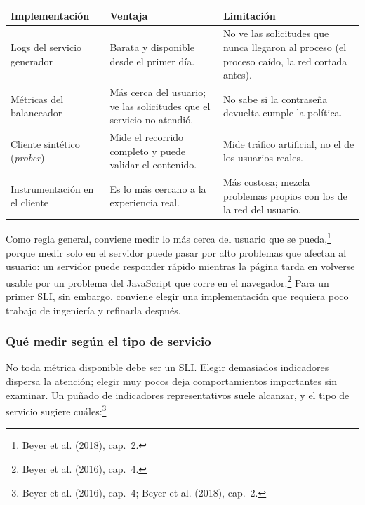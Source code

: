 \documentclass[variant=apuntes,cover=institutional,mode=screen]{ua-engineering-v6-article}
\begin{document}
\begin{center}
\begin{tabular}{p{}p{}p{}}
\toprule
\textbf{Implementación} & \textbf{Ventaja} & \textbf{Limitación} \\
\midrule
Logs del servicio generador & Barata y disponible desde el primer día. & No ve las solicitudes que nunca llegaron al proceso (el proceso caído, la red cortada antes). \\
Métricas del balanceador & Más cerca del usuario; ve las solicitudes que el servicio no atendió. & No sabe si la contraseña devuelta cumple la política. \\
Cliente sintético (\emph{prober}) & Mide el recorrido completo y puede validar el contenido. & Mide tráfico artificial, no el de los usuarios reales. \\
Instrumentación en el cliente & Es lo más cercano a la experiencia real. & Más costosa; mezcla problemas propios con los de la red del usuario. \\
\bottomrule
\end{tabular}
\end{center}

Como regla general, conviene medir lo más cerca del usuario que se pueda,\footnote{Beyer et al. (2018), cap.~2.} porque medir solo en el servidor puede pasar por alto problemas que afectan al usuario: un servidor puede responder rápido mientras la página tarda en volverse usable por un problema del JavaScript que corre en el navegador.\footnote{Beyer et al. (2016), cap.~4.} Para un primer SLI, sin embargo, conviene elegir una implementación que requiera poco trabajo de ingeniería y refinarla después.

\subsubsection{Qué medir según el tipo de servicio}

No toda métrica disponible debe ser un SLI. Elegir demasiados indicadores dispersa la atención; elegir muy pocos deja comportamientos importantes sin examinar. Un puñado de indicadores representativos suele alcanzar, y el tipo de servicio sugiere cuáles:\footnote{Beyer et al. (2016), cap.~4; Beyer et al. (2018), cap.~2.}
\end{document}
